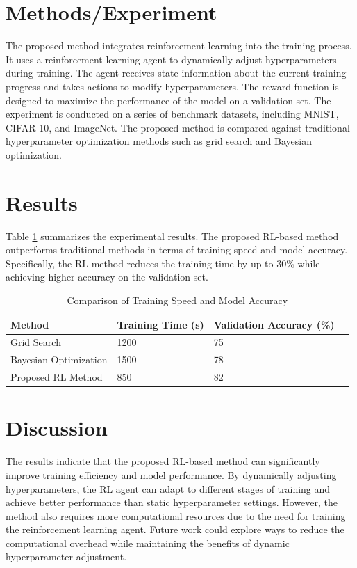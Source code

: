 \documentclass{article}
\begin{document}
\section{Methods/Experiment}
The proposed method integrates reinforcement learning into the training process. It uses a reinforcement learning agent to dynamically adjust hyperparameters during training. The agent receives state information about the current training progress and takes actions to modify hyperparameters. The reward function is designed to maximize the performance of the model on a validation set. The experiment is conducted on a series of benchmark datasets, including MNIST, CIFAR-10, and ImageNet. The proposed method is compared against traditional hyperparameter optimization methods such as grid search and Bayesian optimization.

\section{Results}
Table \ref{tab:results} summarizes the experimental results. The proposed RL-based method outperforms traditional methods in terms of training speed and model accuracy. Specifically, the RL method reduces the training time by up to 30\% while achieving higher accuracy on the validation set.

\begin{table}[ht]
\centering
\caption{Comparison of Training Speed and Model Accuracy}
\label{tab:results}
\begin{tabular}{@{}llll@{}}
\toprule
Method & Training Time (s) & Validation Accuracy (\%) \\ \midrule
Grid Search & 1200 & 75 \\
Bayesian Optimization & 1500 & 78 \\
Proposed RL Method & 850 & 82 \\ \bottomrule
\end{tabular}
\end{table}

\section{Discussion}
The results indicate that the proposed RL-based method can significantly improve training efficiency and model performance. By dynamically adjusting hyperparameters, the RL agent can adapt to different stages of training and achieve better performance than static hyperparameter settings. However, the method also requires more computational resources due to the need for training the reinforcement learning agent. Future work could explore ways to reduce the computational overhead while maintaining the benefits of dynamic hyperparameter adjustment.
\end{document}

